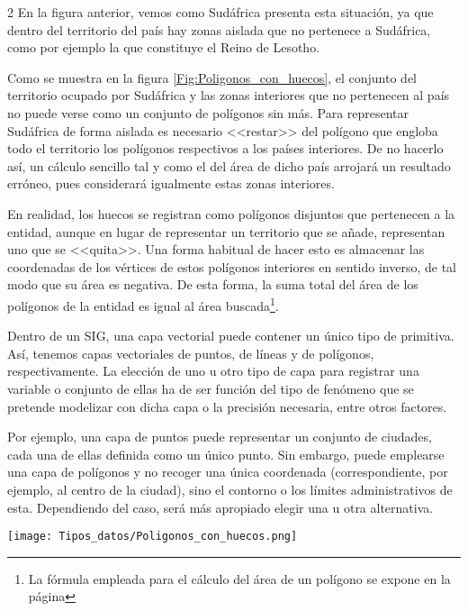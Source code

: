 \begin{multicols}{2}
En la figura anterior, vemos como Sudáfrica presenta esta situación, ya que dentro del territorio del país hay zonas aislada que no pertenece a Sudáfrica, como por ejemplo la que constituye el Reino de Lesotho.

Como se muestra en la figura \ref{Fig:Poligonos_con_huecos}, el conjunto del territorio ocupado por Sudáfrica y las zonas interiores que no pertenecen al país no puede verse como un conjunto de polígonos sin más. Para representar Sudáfrica de forma aislada es necesario <<restar>> del polígono que engloba todo el territorio los polígonos respectivos a los países interiores. De no hacerlo así, un cálculo sencillo tal y como el del área de dicho país arrojará un resultado erróneo, pues considerará igualmente estas zonas interiores.

En realidad, los huecos se registran como polígonos disjuntos que pertenecen a la entidad, aunque en lugar de representar un territorio que se añade, representan uno que se <<quita>>. Una forma habitual de hacer esto es almacenar las coordenadas de los vértices de estos polígonos interiores en sentido inverso, de tal modo que su área es negativa. De esta forma, la suma total del área de los polígonos de la entidad es igual al área buscada\footnote{La fórmula empleada para el cálculo del área de un polígono se expone en la página \pageref{Eq:Area_poligono}}.


Dentro de un SIG, una capa vectorial puede contener un único tipo de primitiva. Así, tenemos capas vectoriales de puntos, de líneas y de polígonos, respectivamente. La elección de uno u otro tipo de capa para registrar una variable o conjunto de ellas ha de ser función del tipo de fenómeno que se pretende modelizar con dicha capa o la precisión necesaria, entre otros factores. 

Por ejemplo, una capa de puntos puede representar un conjunto de ciudades, cada una de ellas definida como un único punto. Sin embargo, puede emplearse una capa de polígonos y no recoger una única coordenada (correspondiente, por ejemplo, al centro de la ciudad), sino el contorno o los límites administrativos de esta. Dependiendo del caso, será más apropiado elegir una u otra alternativa.

\begin{figure*}[ht]
\centering
\texttt{[image: Tipos\_datos/Poligonos\_con\_huecos.png]}
\caption{\small Los huecos de un polígono han de considerarse como parte de este.}
\label{Fig:Poligonos_con_huecos} 
\end{figure*}


\end{multicols}
